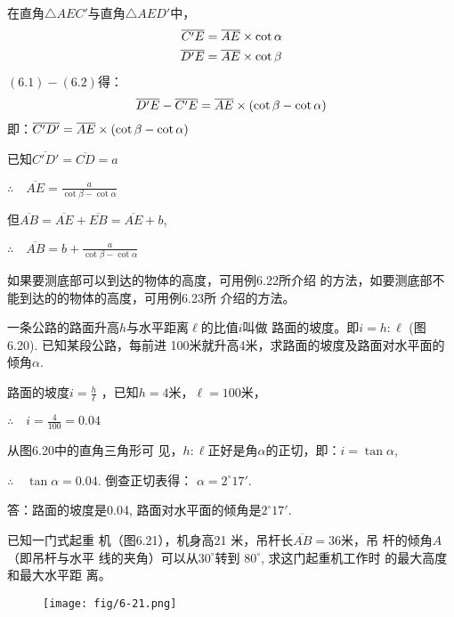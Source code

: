 \begin{solution}
    在直角$\triangle AEC'$与直角$\triangle AED'$中，
\begin{align}
    \overline{C'E}&=\overline{AE}\times \cot\alpha\\
    \overline{D'E}&=\overline{AE}\times \cot\beta
\end{align}
$(6.1)-(6.2)$得：
\[\overline{D'E}-\overline{C'E}=\overline{AE} \times(\cot\beta-\cot\alpha)\]
即：$\overline{C'D'}=\overline{AE} \times(\cot\beta-\cot\alpha)$

已知$\overline{C'D'}=\overline{CD}=a$

$\therefore\quad \overline{AE}=\frac{a}{\cot\beta-\cot\alpha}$

但$\overline{AB}=\overline{AE}+\overline{EB}=\overline{AE} +b$, 

$\therefore\quad \overline{AB}=b+\frac{a}{\cot\beta-\cot\alpha}$

\end{solution}

如果要测底部可以到达的物体的高度，可用例6.22所介绍
的方法，如要测底部不能到达的的物体的高度，可用例6.23所
介绍的方法。

\begin{example}
    一条公路的路面升高$h$与水平距离$\ell$的比值$i$叫做
    路面的坡度。即$i=h:\ell$ (图6.20). 已知某段公路，每前进
    100米就升高4米，求路面的坡度及路面对水平面的倾角$\alpha$.
\end{example}

\begin{solution}
    路面的坡度$i=\frac{h}{\ell}$
    ，已知$h=4$米，$\ell=100$米，

$\therefore\quad  i=\frac{4}{100}=0.04$

    从图6.20中的直角三角形可
    见，$h:\ell$正好是角$\alpha$的正切，即：$i=\tan\alpha$,
    
    $\therefore\quad \tan\alpha=0.04$. 倒查正切表得：
    $\alpha=2^{\circ}17'$.

    答：路面的坡度是0.04, 路面对水平面的倾角是$2^{\circ}17'$.
\end{solution}

\begin{example}
   已知一门式起重
机（图6.21），机身高21
米，吊杆长$\overline{AB}=36$米，吊
杆的倾角$A$（即吊杆与水平
线的夹角）可以从$30^{\circ}$转到
$80^{\circ}$, 求这门起重机工作时
的最大高度和最大水平距
离。
\end{example}
    
\begin{figure}[htp]
    \centering
\texttt{[image: fig/6-21.png]}
    \caption{}
\end{figure}

